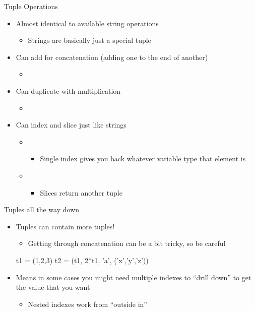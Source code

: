 \documentclass[pdf, aspectratio=169, 12pt]{beamer}
\begin{document}
\begin{frame}{Tuple Operations}
	\begin{itemize}
		\item Almost identical to available string operations
			\begin{itemize}
				\item Strings are basically just a special tuple
			\end{itemize}
		\item Can add for concatenation (adding one to the end of another)
			\begin{itemize}
				\item {}
			\end{itemize}
		\item Can duplicate with multiplication
			\begin{itemize}
				\item {}
			\end{itemize}
		\item Can index and slice just like strings
			\begin{itemize}
				\item {}
					\begin{itemize}
						\item Single index gives you back whatever variable type that element is
					\end{itemize}
					
				\item {}
					\begin{itemize}
						\item Slices return another tuple
					\end{itemize}
			\end{itemize}
	\end{itemize}
\end{frame}

\begin{frame}[fragile]{Tuples all the way down}
	\begin{itemize}
		\item Tuples can contain more tuples!
			\begin{itemize}
				\item Getting through concatenation can be a bit tricky, so be careful
					
			\end{itemize}
			\begin{pythoncode}
				t1 = (1,2,3)
				t2 = (t1, 2*t1, 'a', ('x','y','z'))
			\end{pythoncode}
		\item Means in some cases you might need multiple indexes to ``drill down'' to get the value that you want
			\begin{itemize}
				\item Nested indexes work from ``outside in''
			\end{itemize}
	\end{itemize}
\end{frame}
\end{document}
